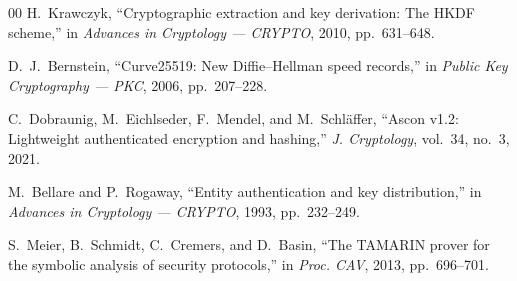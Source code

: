 \documentclass[journal]{IEEEtran}
\begin{document}
\begin{thebibliography}{00}
H.~Krawczyk, ``Cryptographic extraction and key derivation: The HKDF scheme,'' in \emph{Advances in Cryptology --- CRYPTO}, 2010, pp.~631--648.

D.~J.~Bernstein, ``Curve25519: New Diffie--Hellman speed records,'' in \emph{Public Key Cryptography --- PKC}, 2006, pp.~207--228.

C.~Dobraunig, M.~Eichlseder, F.~Mendel, and M.~Schl\"affer, ``Ascon v1.2: Lightweight authenticated encryption and hashing,'' \emph{J. Cryptology}, vol.~34, no.~3, 2021.

M.~Bellare and P.~Rogaway, ``Entity authentication and key distribution,'' in \emph{Advances in Cryptology --- CRYPTO}, 1993, pp.~232--249.

S.~Meier, B.~Schmidt, C.~Cremers, and D.~Basin, ``The TAMARIN prover for the symbolic analysis of security protocols,'' in \emph{Proc. CAV}, 2013, pp.~696--701.

\end{thebibliography}
\end{document}
